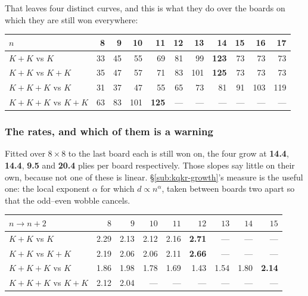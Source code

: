\documentclass[11pt]{article}
\begin{document}
That leaves four distinct curves, and this is what they do over the boards on
which they are still won everywhere:

\begin{center}\small
\begin{tabular}{@{}lrrrrrrrrrr@{}}
\toprule
$n$ & 8 & 9 & 10 & 11 & 12 & 13 & \textbf{14} & 15 & 16 & 17\\
\midrule
$K\!+\!K$ vs $K$        & 33 & 45 & 55 & 69 & 81 & 99 & \textbf{123} & 73 & 73 & 73\\
$K\!+\!K$ vs $K\!+\!K$  & 35 & 47 & 57 & 71 & 83 & 101 & \textbf{125} & 73 & 73 & 73\\
$K\!+\!K\!+\!K$ vs $K$  & 31 & 37 & 47 & 55 & 65 & 73 & 81 & 91 & 103 & 119\\
$K\!+\!K\!+\!K$ vs $K\!+\!K$ & 63 & 83 & 101 & \textbf{125} & --- & --- & --- & --- & --- & ---\\
\bottomrule
\end{tabular}
\end{center}

\subsubsection{The rates, and which of them is a warning}\label{sub:kings-rates}

\noindent
Fitted over $8\times8$ to the last board each is still won on, the four grow at
\textbf{14.4}, \textbf{14.4}, \textbf{9.5} and \textbf{20.4} plies per board
respectively. Those slopes say little on their own, because not one of these is
linear. \S\ref{sub:kqkr-growth}'s measure is the useful one: the local exponent
$\alpha$ for which $d \propto n^{\alpha}$, taken between boards two apart so
that the odd--even wobble cancels.

\begin{center}\small
\begin{tabular}{@{}lrrrrrrrr@{}}
\toprule
$n \to n+2$ & $8$ & $9$ & $10$ & $11$ & $12$ & $13$ & $14$ & $15$\\
\midrule
$K\!+\!K$ vs $K$             & 2.29 & 2.13 & 2.12 & 2.16 & \textbf{2.71} & --- & --- & ---\\
$K\!+\!K$ vs $K\!+\!K$       & 2.19 & 2.06 & 2.06 & 2.11 & \textbf{2.66} & --- & --- & ---\\
$K\!+\!K\!+\!K$ vs $K$       & 1.86 & 1.98 & 1.78 & 1.69 & 1.43 & 1.54 & 1.80 & \textbf{2.14}\\
$K\!+\!K\!+\!K$ vs $K\!+\!K$ & 2.12 & 2.04 & --- & --- & --- & --- & --- & ---\\
\bottomrule
\end{tabular}
\end{center}
\end{document}
